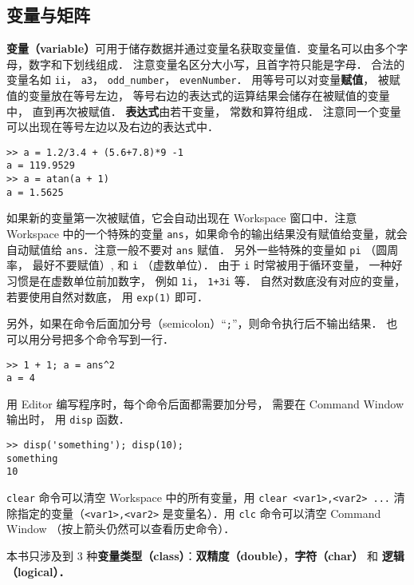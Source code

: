 

\subsection{变量与矩阵}
\textbf{变量（variable）}可用于储存数据并通过变量名获取变量值．变量名可以由多个字母，数字和下划线组成． 注意变量名区分大小写，且首字符只能是字母． 合法的变量名如 \lstinline|ii|， \lstinline|a3|， \lstinline|odd_number|， \lstinline|evenNumber|． 用等号可以对变量\textbf{赋值}， 被赋值的变量放在等号左边， 等号右边的表达式的运算结果会储存在被赋值的变量中， 直到再次被赋值． \textbf{表达式}由若干变量， 常数和算符组成． 注意同一个变量可以出现在等号左边以及右边的表达式中．
\begin{lstlisting}[language=MatlabCom]
>> a = 1.2/3.4 + (5.6+7.8)*9 -1
a = 119.9529
>> a = atan(a + 1)
a = 1.5625
\end{lstlisting}
如果新的变量第一次被赋值，它会自动出现在 Workspace 窗口中．注意 Workspace 中的一个特殊的变量 \lstinline|ans|，如果命令的输出结果没有赋值给变量，就会自动赋值给 \lstinline|ans|．注意一般不要对 \lstinline|ans| 赋值． 另外一些特殊的变量如 \lstinline|pi| （圆周率， 最好不要赋值）, 和 \lstinline|i| （虚数单位）． 由于 \lstinline|i| 时常被用于循环变量， 一种好习惯是在虚数单位前加数字， 例如 \lstinline|1i|， \lstinline|1+3i| 等． 自然对数底没有对应的变量， 若要使用自然对数底， 用 \lstinline|exp(1)| 即可．

另外，如果在命令后面加分号（semicolon）“\lstinline|;|”，则命令执行后不输出结果． 也可以用分号把多个命令写到一行．
\begin{lstlisting}[language=MatlabCom]
>> 1 + 1; a = ans^2
a = 4
\end{lstlisting}
用 Editor 编写程序时，每个命令后面都需要加分号， 需要在 Command Window 输出时， 用 \lstinline|disp| 函数．
\begin{lstlisting}[language=MatlabCom]
>> disp('something'); disp(10);
something
10
\end{lstlisting}

\lstinline|clear| 命令可以清空 Workspace 中的所有变量，用 \lstinline|clear <var1>,<var2> ...| 清除指定的变量（\lstinline|<var1>,<var2>| 是变量名）．用 \lstinline|clc| 命令可以清空 Command Window （按上箭头仍然可以查看历史命令）．

本书只涉及到 3 种\textbf{变量类型（class）}：\textbf{双精度（double）}，\textbf{字符（char）} 和 \textbf{逻辑（logical）．}

